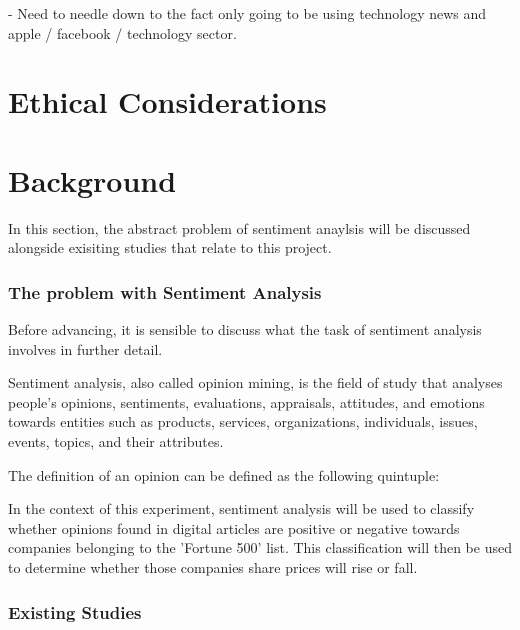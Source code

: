 \documentclass[a4paper,11pt]{report}
\begin{document}
- Need to needle down to the fact only going to be using technology news and apple / facebook / technology sector.

\chapter{Ethical Considerations}
\label{chap:ethical-con}

\chapter{Background}
\label{chap:background}

In this section, the abstract problem of sentiment anaylsis will be discussed alongside exisiting studies that relate to this project.

\subsection{The problem with Sentiment Analysis}
Before advancing, it is sensible to discuss what the task of sentiment analysis involves in further detail.

Sentiment analysis, also called opinion mining, is the field of study that analyses people’s opinions, sentiments, evaluations, appraisals, attitudes, and emotions towards entities such as products, services, organizations, individuals, issues, events, topics, and their attributes.

 The definition of an opinion can be defined as the following quintuple:

In the context of this experiment, sentiment analysis will be used to classify whether opinions found in digital articles are positive or negative towards companies belonging to the 'Fortune 500' list. This classification will then be used to determine whether those companies share prices will rise or fall.

\subsection{Existing Studies}
\end{document}
